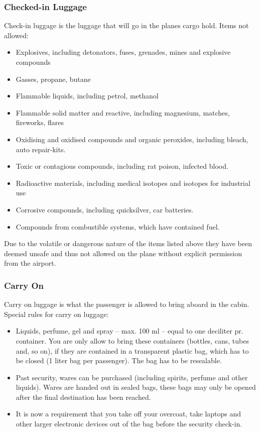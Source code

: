 \subsubsection{Checked-in Luggage}
Check-in luggage is the luggage that will go in the planes cargo hold.
\newline 
Items not allowed:
\begin{itemize}
\item Explosives, including detonators, fuses, grenades, mines and explosive compounds
\item Gasses, propane, butane
\item Flammable liquids, including petrol, methanol
\item Flammable solid matter and reactive, including magnesium, matches, fireworks, flares
\item Oxidising and oxidised compounds and organic peroxides, including bleach, auto repair-kits.
\item Toxic or contagious compounds, including rat poison, infected blood.
\item Radioactive materials, including medical isotopes and isotopes for industrial use
\item Corrosive compounds, including quicksilver, car batteries.
\item Compounds from combustible systems, which have contained fuel.
\end{itemize}
Due to the volatile or dangerous nature of the items listed above they have been deemed unsafe and thus not allowed on the plane without explicit permission from the airport.

\subsubsection{Carry On}
Carry on luggage is what the passenger is allowed to bring aboard in the cabin.
\newline
Special rules for carry on luggage:
\begin{itemize}
\item Liquids, perfume, gel and spray – max. 100 ml – equal to one deciliter pr. container. You are only allow to bring these containers (bottles, cans, tubes and, so on), if they are contained in a transparent plastic bag, which has to be closed (1 liter bag per passenger). The bag has to be resealable.
\item Past security, wares can be purchased (including spirits, perfume and other liquids). Wares are handed out in sealed bags, these bags may only be opened after the final destination has been reached.
\item It is now a requirement that you take off your overcoat, take laptops and other larger electronic devices out of the bag before the security check-in.\\
\citep{Prohibited_luggage}
\end{itemize}

